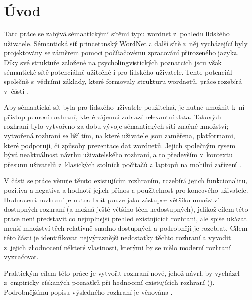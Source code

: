 \documentclass[a4paper,11pt,openany,twoside]{book}
\newcommand{\itNameRef}[1]{\textit{\nameref{#1}}}
\begin{document}
	\newpage

	
	
	\chapter*{Úvod}\label{uvod}


	

		Tato práce se zabývá sémantickými sítěmi typu wordnet z~pohledu lidského uživatele. Sémantická síť princetonský WordNet a další sítě z~něj vycházející byly projektovány se záměrem pomoci počítačovému zpracování přirozeného jazyka. Díky své struktuře založené na psycholingvistických poznatcích jsou však sémantické sítě potenciálně užitečné i pro lidského uživatele. Tento potenciál společně s~vědními základy, které formovaly strukturu wordnetů, práce rozebírá v~části \itNameRef{part:eins}.

		Aby sémantická síť byla pro lidského uživatele použitelná, je nutné umožnit k~ní přístup pomocí rozhraní, které zájemci zobrazí relevantní data. Takových rozhraní bylo vytvořeno za dobu vývoje sémantických sítí značné množství; vytvořená rozhraní se liší tím, na které uživatele jsou zaměřena, platformami, které podporují, či způsoby prezentace dat wordnetů. Jejich společným rysem bývá neaktuálnost návrhu uživatelského rozhraní, a to především v~kontextu přesunu uživatelů z~klasických stolních počítačů a laptopů na mobilní zařízení  \parencite{grace2013mobile}.

		V části \itNameRef{part:zwei} se práce věnuje těmto existujícím rozhraním, rozebírá jejich funkcionalitu, pozitiva a negativa a hodnotí jejich přínos a použitelnost pro koncového uživatele. Hodnocená rozhraní je nutno brát pouze jako zástupce většího množství dostupných rozhraní (a možná ještě většího těch nedostupných), jelikož cílem této práce není představit co nejúplnější přehled existujících rozhraní, ale spíše ukázat menší množství těch relativně snadno dostupných a podrobněji je rozebrat. Cílem této části je identifikovat nejvýraznější nedostatky těchto rozhraní a vyvodit z~jejich zhodnocení některé vlastnosti, kterými by se mělo moderní rozhraní vyznačovat. 

		Praktickým cílem této práce je vytvořit rozhraní nové, jehož návrh by vycházel z~empiricky získaných poznatků při hodnocení existujících rozhraní (\itNameRef{part:zwei}). Podrobnějšímu popisu výsledného rozhraní je věnována \itNameRef{part:drei}.
\end{document}
